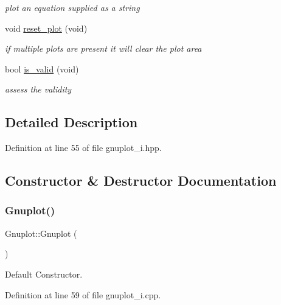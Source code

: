 \begin{DoxyCompactItemize}
\begin{DoxyCompactList}\small\item\em plot an equation supplied as a string \end{DoxyCompactList}\item 
void \mbox{\hyperlink{class_gnuplot_ad54976652afe30231a850dd31e1ca70f}{reset\+\_\+plot}} (void)
\begin{DoxyCompactList}\small\item\em if multiple plots are present it will clear the plot area \end{DoxyCompactList}\item 
bool \mbox{\hyperlink{class_gnuplot_a0daaf54cd8e41dbbd574722f3a831cfd}{is\+\_\+valid}} (void)
\begin{DoxyCompactList}\small\item\em assess the validity \end{DoxyCompactList}\end{DoxyCompactItemize}


\subsection{Detailed Description}


Definition at line 55 of file gnuplot\+\_\+i.\+hpp.



\subsection{Constructor \& Destructor Documentation}
\mbox{\label{class_gnuplot_a936d27de7b6f57d1f3d61491dc70f1ae}} 
\subsubsection{\texorpdfstring{Gnuplot()}{Gnuplot()}\hspace{0.1cm}{\footnotesize\ttfamily [1/4]}}
{\footnotesize\ttfamily Gnuplot\+::\+Gnuplot (\begin{DoxyParamCaption}{ }\end{DoxyParamCaption})}



Default Constructor. 



Definition at line 59 of file gnuplot\+\_\+i.\+cpp.

\mbox{\label{class_gnuplot_a4acdc327a6a9eb3c4ab3f37814dce26e}} 
